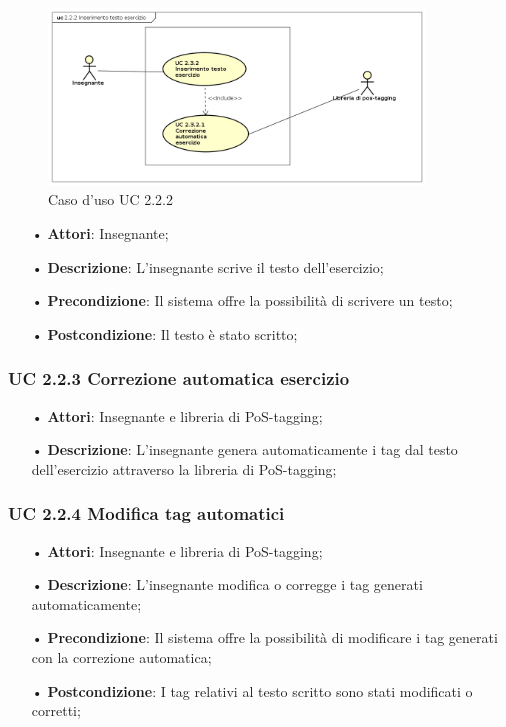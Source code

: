 \begin{figure}[H]
	\centering
	\includegraphics[width=10cm]{img/UC222.png} 
	\caption{Caso d'uso UC 2.2.2}
\end{figure}

\begin{itemize}
	\item[•] \textbf{Attori}: Insegnante;
	\item[•] \textbf{Descrizione}: L'insegnante scrive il testo dell’esercizio;
	\item[•] \textbf{Precondizione}: Il sistema offre la possibilità di scrivere un testo;
	\item[•] \textbf{Postcondizione}: Il testo è stato scritto;
\end{itemize}

\subsubsection{UC 2.2.3	Correzione automatica esercizio}
\begin{itemize}
	\item[•] \textbf{Attori}: Insegnante e libreria di {PoS-tagging};
	\item[•] \textbf{Descrizione}: L’insegnante genera automaticamente i tag dal testo dell’esercizio attraverso la libreria di PoS-tagging;
\end{itemize}
\subsubsection{UC 2.2.4	Modifica tag automatici}
\begin{itemize}
	\item[•] \textbf{Attori}: Insegnante e libreria di PoS-tagging;
	\item[•] \textbf{Descrizione}: L’insegnante modifica o corregge i tag generati automaticamente;
	\item[•] \textbf{Precondizione}: Il sistema offre la possibilità di modificare i tag generati con la correzione automatica;
	\item[•] \textbf{Postcondizione}: I tag relativi al testo scritto sono stati modificati o corretti;
\end{itemize}
